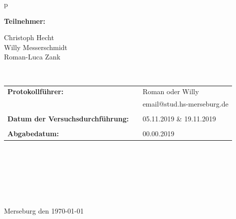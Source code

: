 \begin{center}
\begin{tabular}{p{\textwidth}}
\begin{center}
\Large{\textbf{Teilnehmer:}} \\ 
\end{center}
\begin{center}
\large{	Christoph Hecht \\
Willy Messerschmidt \\
Roman-Luca Zank\\}
\end{center}


\\

\begin{center}
\begin{tabular}{lll}
\large{\textbf{Protokollführer:}} & & \large{Roman oder Willy} \\
& & email@stud.hs-merseburg.de\\
&&\\
\large{\textbf{Datum der Versuchsdurchführung:}}&& \large{05.11.2019 \& 19.11.2019}\\
&&\\
\large{\textbf{Abgabedatum:}}&& \large{00.00.2019}
\end{tabular}
\end{center}

\\ \\ \\ \\ \\ \\
\large{Merseburg den \today}

\end{tabular}
\end{center}
